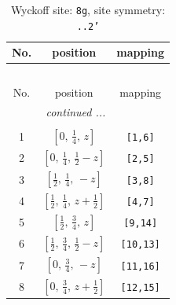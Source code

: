 \documentclass[fleqn,8pt]{jsarticle}
\begin{document}
\begin{longtable}{ccc}
\caption{Wyckoff site: {\tt 8g}, site symmetry: {\tt ..2'}}
 \\
 \hline \hline
No. & position & mapping \\ \hline \endfirsthead

\multicolumn{2}{l}{\tablename\ \thetable{}} \\
 \hline \hline
No. & position & mapping \\ \hline \endhead

 \hline \hline
\multicolumn{2}{r}{\footnotesize\it continued ...} \\ \endfoot

 \hline \hline
\multicolumn{2}{r}{} \\ \endlastfoot

1 & $\left[ 0,\, \frac{1}{4},\, z \right]$ & {\tt [1,6]} \\ \hline
2 & $\left[ 0,\, \frac{1}{4},\, \frac{1}{2} - z \right]$ & {\tt [2,5]} \\ \hline
3 & $\left[ \frac{1}{2},\, \frac{1}{4},\, - z \right]$ & {\tt [3,8]} \\ \hline
4 & $\left[ \frac{1}{2},\, \frac{1}{4},\, z + \frac{1}{2} \right]$ & {\tt [4,7]} \\ \hline
5 & $\left[ \frac{1}{2},\, \frac{3}{4},\, z \right]$ & {\tt [9,14]} \\ \hline
6 & $\left[ \frac{1}{2},\, \frac{3}{4},\, \frac{1}{2} - z \right]$ & {\tt [10,13]} \\ \hline
7 & $\left[ 0,\, \frac{3}{4},\, - z \right]$ & {\tt [11,16]} \\ \hline
8 & $\left[ 0,\, \frac{3}{4},\, z + \frac{1}{2} \right]$ & {\tt [12,15]} \\
\end{longtable}
\renewcommand{\arraystretch}{1.2}
\end{document}
